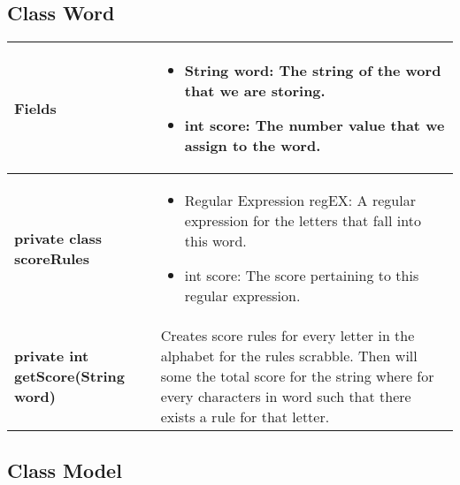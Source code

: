 \documentclass[11pt]{article}
\begin{document}
\subsection{Class Word}
\begin{tabular}{|p{}|p{}|}
\hline
\textbf{Fields} &
\begin{itemize}
	\item String word: The string of the word that we are storing.
	\item int score: The number value that we assign to the word.
\end{itemize} \\
%
\hline
\textbf{private class scoreRules} &
\begin{itemize}
	\item Regular Expression regEX: A regular expression for the letters that fall into this word.
	\item int score: The score pertaining to this regular expression.
\end{itemize} \\
%
\hline
\textbf{private int getScore(String word)} & Creates score rules for every letter in the alphabet for the rules scrabble. Then will some the total score for the string where for every characters in word such that there exists a rule for that letter.\\
\hline
\end{tabular}
%
%
\subsection{Class Model}
\end{document}
